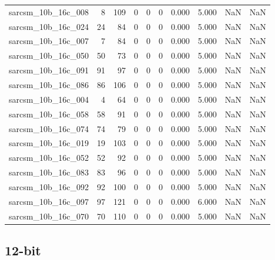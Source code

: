 \documentclass{article}
\begin{document}
\begin{longtable}{lrrrrrrrrr}
sarcsm\_10b\_16c\_008 & 8 & 109 & 0 & 0 & 0 & 0.000 & 5.000 & NaN & NaN \\
sarcsm\_10b\_16c\_024 & 24 & 84 & 0 & 0 & 0 & 0.000 & 5.000 & NaN & NaN \\
sarcsm\_10b\_16c\_007 & 7 & 84 & 0 & 0 & 0 & 0.000 & 5.000 & NaN & NaN \\
sarcsm\_10b\_16c\_050 & 50 & 73 & 0 & 0 & 0 & 0.000 & 5.000 & NaN & NaN \\
sarcsm\_10b\_16c\_091 & 91 & 97 & 0 & 0 & 0 & 0.000 & 5.000 & NaN & NaN \\
sarcsm\_10b\_16c\_086 & 86 & 106 & 0 & 0 & 0 & 0.000 & 5.000 & NaN & NaN \\
sarcsm\_10b\_16c\_004 & 4 & 64 & 0 & 0 & 0 & 0.000 & 5.000 & NaN & NaN \\
sarcsm\_10b\_16c\_058 & 58 & 91 & 0 & 0 & 0 & 0.000 & 5.000 & NaN & NaN \\
sarcsm\_10b\_16c\_074 & 74 & 79 & 0 & 0 & 0 & 0.000 & 5.000 & NaN & NaN \\
sarcsm\_10b\_16c\_019 & 19 & 103 & 0 & 0 & 0 & 0.000 & 5.000 & NaN & NaN \\
sarcsm\_10b\_16c\_052 & 52 & 92 & 0 & 0 & 0 & 0.000 & 5.000 & NaN & NaN \\
sarcsm\_10b\_16c\_083 & 83 & 96 & 0 & 0 & 0 & 0.000 & 5.000 & NaN & NaN \\
sarcsm\_10b\_16c\_092 & 92 & 100 & 0 & 0 & 0 & 0.000 & 5.000 & NaN & NaN \\
sarcsm\_10b\_16c\_097 & 97 & 121 & 0 & 0 & 0 & 0.000 & 6.000 & NaN & NaN \\
sarcsm\_10b\_16c\_070 & 70 & 110 & 0 & 0 & 0 & 0.000 & 5.000 & NaN & NaN \\
\end{longtable}

\subsection*{12-bit}
\end{document}
